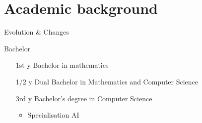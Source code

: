 \documentclass[hyperref={bookmarks=false},aspectratio=169]{beamer}
\begin{document}
\section{Academic background}

\begin{frame}{Evolution \& Changes}
  \begin{alertblock}{Bachelor}
    \begin{itemize}
      \item[1st y] Bachelor in mathematics
      \item[1/2 y] Dual Bachelor in Mathematics and Computer Science
      \item[3rd y] Bachelor's degree in Computer Science
      \begin{itemize}
        \item Specialisation AI
      \end{itemize}
    \end{itemize}
  \end{alertblock}

\end{frame}
\end{document}
